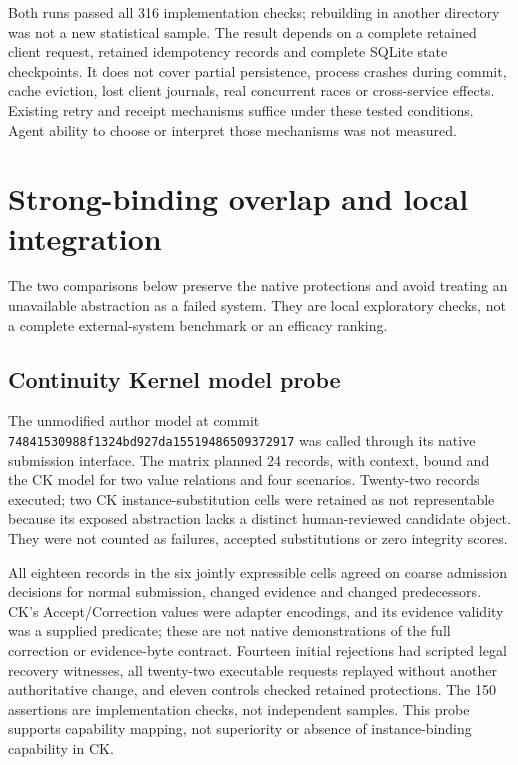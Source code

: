 \documentclass[10pt,a4paper]{article}
\begin{document}
Both runs passed all 316 implementation checks; rebuilding in another directory was not a new statistical sample. The result depends on a complete retained client request, retained idempotency records and complete SQLite state checkpoints. It does not cover partial persistence, process crashes during commit, cache eviction, lost client journals, real concurrent races or cross-service effects. Existing retry and receipt mechanisms suffice under these tested conditions. Agent ability to choose or interpret those mechanisms was not measured.

\section{Strong-binding overlap and local integration}
The two comparisons below preserve the native protections and avoid treating an unavailable abstraction as a failed system. They are local exploratory checks, not a complete external-system benchmark or an efficacy ranking.

\subsection*{Continuity Kernel model probe}
The unmodified author model at commit \nolinkurl{74841530988f1324bd927da15519486509372917} was called through its native submission interface. The matrix planned 24 records, with context, bound and the CK model for two value relations and four scenarios. Twenty-two records executed; two CK instance-substitution cells were retained as not representable because its exposed abstraction lacks a distinct human-reviewed candidate object. They were not counted as failures, accepted substitutions or zero integrity scores.

All eighteen records in the six jointly expressible cells agreed on coarse admission decisions for normal submission, changed evidence and changed predecessors. CK's Accept/Correction values were adapter encodings, and its evidence validity was a supplied predicate; these are not native demonstrations of the full correction or evidence-byte contract. Fourteen initial rejections had scripted legal recovery witnesses, all twenty-two executable requests replayed without another authoritative change, and eleven controls checked retained protections. The 150 assertions are implementation checks, not independent samples. This probe supports capability mapping, not superiority or absence of instance-binding capability in CK.
\end{document}
